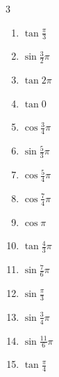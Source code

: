 \begin{multicols}{3}
\begin{enumerate}
  \item $\displaystyle \tan{\frac{\pi}{3}}$

  \item $\displaystyle \sin{\frac{3}{2}\pi}$
        \phantom{$\displaystyle =-1$}

  \item $\displaystyle \tan{2\pi}$
        \phantom{$\displaystyle =0$}

  \item $\displaystyle \tan{0}$
        \phantom{$\displaystyle =0$}

  \item $\displaystyle \cos{\frac{3}{4}\pi}$

  \item $\displaystyle \sin{\frac{5}{3}\pi}$

\columnbreak %

  \item $\displaystyle \cos{\frac{5}{4}\pi}$

  \item $\displaystyle \cos{\frac{7}{4}\pi}$

  \item $\displaystyle \cos{\pi}$
        \phantom{$\displaystyle =-1$}

  \item $\displaystyle \tan{\frac{4}{3}\pi}$

  \item $\displaystyle \sin{\frac{7}{6}\pi}$

  \item $\displaystyle \sin{\frac{\pi}{3}}$

  \item $\displaystyle \sin{\frac{3}{4}\pi}$

  \item $\displaystyle \sin{\frac{11}{6}\pi}$

  \item $\displaystyle \tan{\frac{\pi}{4}}$
        \phantom{$\displaystyle =1$}


\end{enumerate}
\end{multicols}
